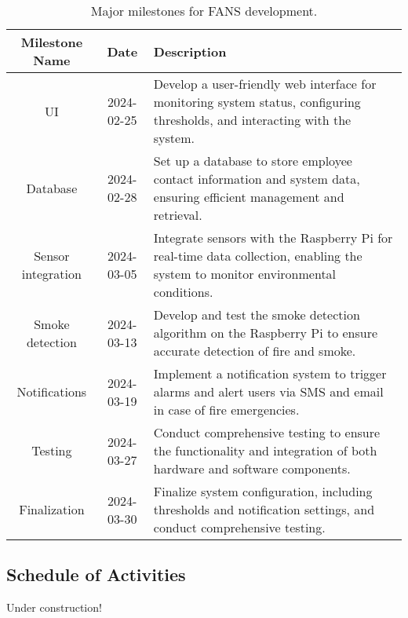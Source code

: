\begin{table}[H]
    \centering
    \begin{tabular}{| c | c | p{9cm} |}
        \hline
        \textbf{Milestone Name} & \textbf{Date} & \textbf{Description}                                                                            \\
        \hline
        UI                      & 2024-02-25    & Develop a user-friendly web interface for monitoring system status, configuring thresholds, and
        interacting with the system.                                                                                                              \\
        \hline Database         & 2024-02-28    & Set up a database to store employee contact information
        and system data, ensuring efficient management and retrieval.                                                                             \\
        \hline
        Sensor integration      & 2024-03-05    & Integrate sensors with the Raspberry Pi for real-time data collection, enabling the
        system to monitor environmental conditions.                                                                                               \\
        \hline Smoke detection  & 2024-03-13    & Develop and test
        the smoke detection algorithm on the Raspberry Pi to ensure accurate detection of fire and smoke.                                         \\
        \hline
        Notifications           & 2024-03-19    & Implement a notification system to trigger alarms and alert users via SMS and email
        in case of fire emergencies.                                                                                                              \\
        \hline
        Testing                 & 2024-03-27    & Conduct comprehensive testing to ensure the functionality and integration of both
        hardware and software components.                                                                                                         \\
        \hline
        Finalization            & 2024-03-30    & Finalize system configuration, including thresholds and notification settings, and
        conduct comprehensive testing.                                                                                                            \\
        \hline
    \end{tabular}
    \caption{Major milestones for FANS development.}
\end{table}

\subsection{Schedule of Activities}

Under construction!

